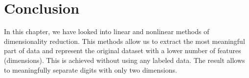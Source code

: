 \documentclass[11pt]{article}
\begin{document}
    \section{Conclusion}\label{conclusion}

In this chapter, we have looked into linear and nonlinear methods of
dimensionality reduction. This methods allow us to extract the most
meaningful part of data and represent the original dataset with a lower
number of features (dimensions). This is achieved without using any
labeled data. The result allows to meaningfully separate digits with
only two dimensions.


    
    
    
    
\end{document}

